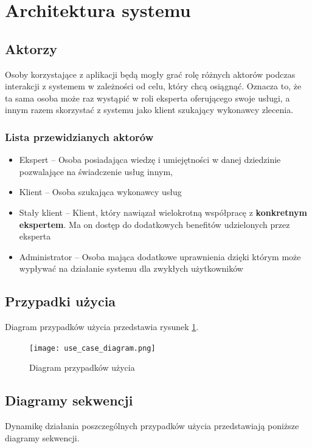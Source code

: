 \documentclass[10pt, titlepage, oneside, a4paper]{article}
\begin{document}
	\section{Architektura systemu}
  
  \subsection{Aktorzy}
	Osoby korzystające z aplikacji będą mogły grać rolę różnych aktorów podczas interakcji z systemem w zależności od celu, który chcą osiągnąć.
	Oznacza to, że ta sama osoba może raz wystąpić w roli eksperta oferującego swoje usługi, a innym razem skorzystać z systemu jako klient szukający wykonawcy zlecenia.

	\subsubsection*{Lista przewidzianych aktorów}
	\begin{itemize}
		\item Ekspert -- Osoba posiadająca wiedzę i umiejętności w danej dziedzinie pozwalające na świadczenie usług innym,
		\item Klient -- Osoba szukająca wykonawcy usług
		\item Stały klient -- Klient, który nawiązał wielokrotną współpracę z \textbf{konkretnym ekspertem}. Ma on dostęp do dodatkowych benefitów udzielonych przez eksperta
		\item Administrator -- Osoba mająca dodatkowe uprawnienia dzięki którym może wypływać na działanie systemu dla zwykłych użytkowników
	\end{itemize}
	
  \subsection{Przypadki użycia}
  Diagram przypadków użycia przedstawia rysunek \ref{fig:ucDiagram}.

  \begin{figure}[h]
	  \centering
	  \texttt{[image: use\_case\_diagram.png]}
	  \caption{Diagram przypadków użycia}
	  \label{fig:ucDiagram}
  \end{figure}
  
  \subsection{Diagramy sekwencji}
	Dynamikę działania poszczególnych przypadków użycia przedstawiają poniższe diagramy sekwencji.
\end{document}
